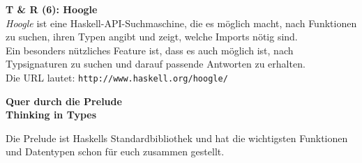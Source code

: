 \documentclass[unknownkeysallowed]{beamer}
\begin{document}
  
  \begin{frame}
    \begin{center}
    \Large\textbf{T \& R (6): Hoogle}\\ \bigskip \normalsize
    \emph{Hoogle} ist eine Haskell-API-Suchmaschine, die es möglich macht, nach Funktionen zu suchen, ihren Typen angibt und zeigt, welche Imports nötig sind.\\ Ein besonders nützliches Feature ist, dass es auch möglich ist, nach Typsignaturen zu suchen und darauf passende Antworten zu erhalten.\\ \bigskip
    Die URL lautet: \texttt{http://www.haskell.org/hoogle/}
    \end{center}
  \end{frame}
  
  
  \begin{frame}

    \begin{center}
    \Large\textbf{Quer durch die Prelude \\ Thinking in Types}
    \end{center}
  \end{frame}
  
  
  \begin{frame}

    \begin{center}    
    Die Prelude ist Haskells Standardbibliothek und hat die wichtigsten Funktionen und Datentypen schon
    für euch zusammen gestellt. 
    \end{center}
  \end{frame}
  
  
\end{document}
